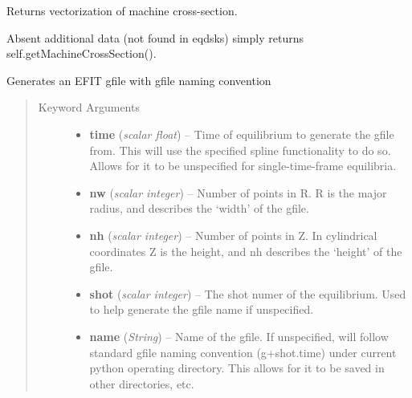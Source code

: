 \documentclass[letterpaper,10pt,english]{sphinxmanual}
\begin{document}
\begin{fulllineitems}
\begin{fulllineitems}
\end{fulllineitems}


\begin{fulllineitems}
\label{eqtools:eqtools.eqdskreader.EqdskReader.getMachineCrossSectionFull}
Returns vectorization of machine cross-section.

Absent additional data (not found in eqdsks) simply returns self.getMachineCrossSection().

\end{fulllineitems}


\begin{fulllineitems}
\label{eqtools:eqtools.eqdskreader.EqdskReader.gfile}
Generates an EFIT gfile with gfile naming convention
\begin{quote}\begin{description}
\item[{Keyword Arguments}] \leavevmode\begin{itemize}
\item {} 
\textbf{time} (\emph{scalar float}) --
Time of equilibrium to
generate the gfile from. This will use the specified
spline functionality to do so. Allows for it to be
unspecified for single-time-frame equilibria.

\item {} 
\textbf{nw} (\emph{scalar integer}) --
Number of points in R.
R is the major radius, and describes the `width' of the
gfile.

\item {} 
\textbf{nh} (\emph{scalar integer}) --
Number of points in Z. In cylindrical
coordinates Z is the height, and nh describes the `height'
of the gfile.

\item {} 
\textbf{shot} (\emph{scalar integer}) --
The shot numer of the equilibrium.
Used to help generate the gfile name if unspecified.

\item {} 
\textbf{name} (\emph{String}) --
Name of the gfile.  If unspecified, will follow
standard gfile naming convention (g+shot.time) under current
python operating directory.  This allows for it to be saved
in other directories, etc.


\end{itemize}
\end{description}
\end{quote}
\end{fulllineitems}
\end{fulllineitems}
\end{document}

